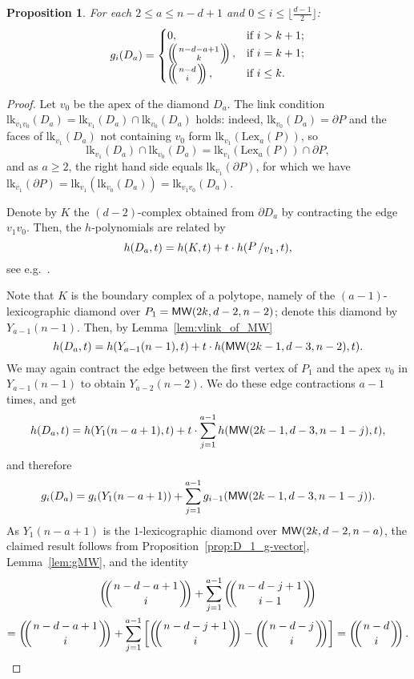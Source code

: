 \documentclass[a4paper,leqno]{article}
\newtheorem{proposition}[theorem]{Proposition}
\theoremstyle{definition}
\newcommand{\lk}{\mathrm{lk}}
\newcommand{\lex}{\mathrm{Lex}}
\newcommand{\mw}{{\sf MW}}
\def\mchoose#1#2{\ensuremath{\left(\kern-.3em\left(\genfrac{}{}{0pt}{}{#1}{#2}\right)\kern-.3em\right)}}
\newcommand{\vfig}[2]{{\raisebox{.1em}{$#1$}\left/\raisebox{-.1em}{$#2$}\right.}}
\begin{document}
\begin{proposition}\label{prop:D_a_g-vector}
For each $2\leq a\leq n-d+1$ and $0 \leq i\leq \lfloor\frac{d-1}{2}\rfloor$:
\[
g_i(D_a)=\begin{cases}
0,& \text{if } i>k+1;\\
\mchoose{n-d-a+1}{k},& \text{if } i=k+1;\\
\mchoose{n-d}{i},& \text{if } i\leq k.
\end{cases}
\]
\end{proposition}
\begin{proof}
Let $v_0$ be the apex of the diamond $D_a$.
The link condition $\lk_{v_1v_0}(D_a)=\lk_{v_1}(D_a)\cap\lk_{v_0}(D_a)$ holds:
indeed, $\lk_{v_0}(D_a)=\partial P$ and the faces of $\lk_{v_1}(D_a)$ not containing $v_0$ form $\lk_{v_1}(\lex_a (P))$, so
\[
\lk_{v_1}(D_a)\cap\lk_{v_0}(D_a)=
\lk_{v_1}(\lex_a (P))\cap \partial P,
\]
and as $a\ge 2$, the right hand side equals
$\lk_{v_1}(\partial P)$, for which we have $\lk_{v_1}(\partial P)=
\lk_{v_1}(\lk_{v_0}(D_a))=
\lk_{v_1v_0}(D_a)$.

Denote by $K$ the $(d-2)$-complex obtained from $\partial D_a$ by contracting the edge $v_1v_0$.
Then, the $h$-polynomials are related by
\[
h(D_a,t)=h(K,t)+t\cdot h(\vfig{P}{v_1},t),
\]
see e.g.~\cite[Eq.~(10)]{nevo_VKobs}.

Note that $K$ is the boundary complex of a polytope, namely of the $(a-1)$-lexicographic diamond over $P_1=\mw(2k,d-2,n-2)$; denote this diamond by $Y_{a-1}(n-1)$.
Then, by Lemma~\ref{lem:vlink_of_MW}
\begin{equation*}
h(D_a,t)=h(Y_{a-1}(n-1),t)+t\cdot h(\mw(2k-1,d-3,n-2),t).
\end{equation*}
We may again contract the edge between the first vertex of $P_1$ and the apex $v_0$ in $Y_{a-1}(n-1)$ to obtain $Y_{a-2}(n-2)$. We do these edge contractions $a-1$ times, and get
\begin{equation*}
h(D_a,t)=h(Y_1(n-a+1),t)+t\cdot \sum_{j=1}^{a-1}h(\mw(2k-1,d-3,n-1-j),t),
\end{equation*}
and therefore
\begin{equation}
g_i(D_a)=g_i(Y_1(n-a+1))+\sum_{j=1}^{a-1}g_{i-1}(\mw(2k-1,d-3,n-1-j)).
\end{equation}
As $Y_1(n-a+1)$ is the $1$-lexicographic diamond over $\mw(2k,d-2,n-a)$,
the claimed result follows from Proposition~\ref{prop:D_1_g-vector}, Lemma~\ref{lem:gMW}, and the identity
\begin{multline*}
\mchoose{n-d-a+1}{i}+\sum\limits_{j=1}^{a-1}\mchoose{n-d-j+1}{i-1} \\
=\mchoose{n-d-a+1}{i}+\sum\limits_{j=1}^{a-1}\left[\mchoose{n-d-j+1}{i}-\mchoose{n-d-j}{i}\right] = \mchoose{n-d}{i}.\qedhere
\end{multline*}
\end{proof}
\end{document}
